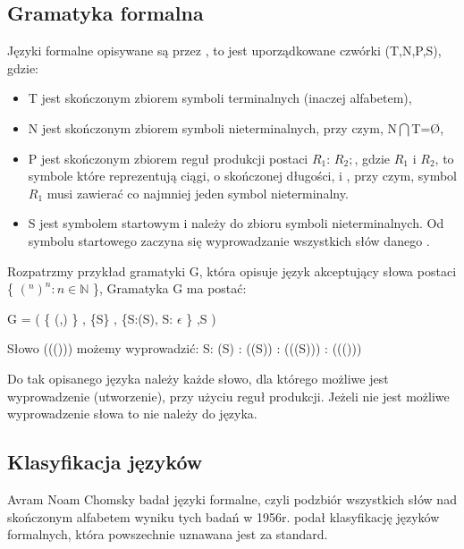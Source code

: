 \subsection{Gramatyka formalna}
 
Języki formalne opisywane są przez ,
to jest uporządkowane czwórki (T,N,P,S), gdzie\cite{aho,link_gramatyka}:
\begin{itemize}
     \item T jest skończonym zbiorem symboli terminalnych (inaczej alfabetem), 
     \item N jest skończonym zbiorem symboli nieterminalnych, przy czym, N$\bigcap$T=\O,
     \item P jest skończonym zbiorem reguł produkcji postaci  $R_1$: $R_2 ;$, gdzie $R_1$ i $R_2$, 
	      to symbole które reprezentują ciągi, o skończonej długości,  i ,
	      przy czym, symbol $R_1$ musi zawierać co najmniej jeden symbol nieterminalny.	    
     \item S jest symbolem startowym i należy do zbioru symboli nieterminalnych.  Od symbolu startowego  zaczyna się wyprowadzanie wszystkich słów danego .
\end{itemize}

  
  Rozpatrzmy przykład gramatyki G, która opisuje język akceptujący słowa postaci \{ $(^n)^n: n \in \mathbb{N}$ \},
  Gramatyka G ma postać: 

    G = (  \{ (,) \} , \{S\} , \{S:(S), S: $\epsilon$ \} ,S )
    
  Słowo ((())) możemy wyprowadzić:
    S: (S) : ((S)) : (((S))) : ((()))

    Do tak opisanego języka należy każde słowo, dla którego możliwe jest wyprowadzenie (utworzenie), przy użyciu reguł produkcji.
    Jeżeli nie jest możliwe wyprowadzenie słowa to nie należy do języka.

\subsection{Klasyfikacja języków} \label{pKlasy}
   
    
Avram Noam Chomsky badał języki formalne, czyli podzbiór wszystkich słów nad skończonym alfabetem 
wyniku tych badań w 1956r. podał klasyfikację języków formalnych, która powszechnie uznawana jest za standard.


